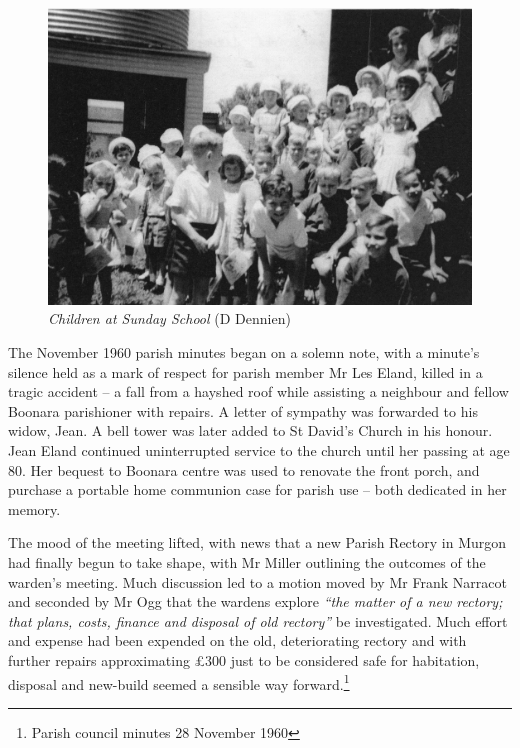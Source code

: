 \begin{figure}[!htb]
\begin{center}
\includegraphics[width=1.\textwidth,center]{../images/sundaySchoolChildren.jpg}
\caption{{\itshape Children at Sunday School} {\scriptsize(D Dennien)}}
\end{center}
\end{figure}




The November 1960 parish minutes began on a solemn note, with a minute's silence held as a mark of respect for parish member Mr Les Eland, killed in a tragic accident -- a fall from a hayshed roof while assisting a neighbour and fellow Boonara parishioner with repairs. A letter of sympathy was forwarded to his widow, Jean. A bell tower was later added to St David's Church in his honour. Jean Eland continued uninterrupted service to the church until her passing at age 80. Her bequest to Boonara centre was used to renovate the front porch, and purchase a portable home communion case for parish use -- both dedicated in her memory.



The mood of the meeting lifted, with news that a new Parish Rectory in Murgon had finally begun to take shape, with Mr Miller outlining the outcomes of the warden's meeting. Much discussion led to a motion moved by Mr Frank Narracot and seconded by Mr Ogg that the wardens explore \emph{``the matter of a new rectory; that plans, costs, finance and disposal of old rectory''} be investigated. Much effort and expense had been expended on the old, deteriorating rectory and with further repairs approximating \pounds300 just to be considered safe for habitation, disposal and new-build seemed a sensible way forward.\footnote{Parish council minutes 28 November 1960}



